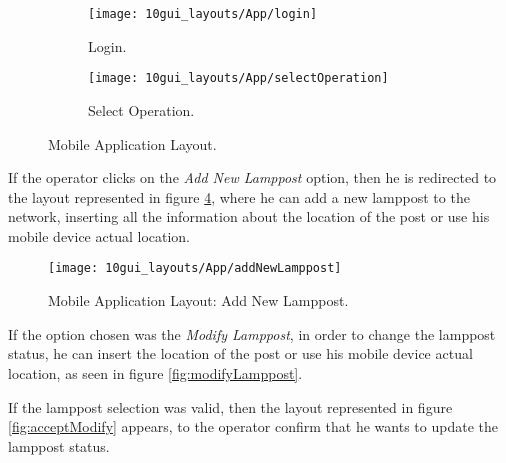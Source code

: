 
\begin{figure}[H]
	\centering
	\begin{subfigure}{.5\textwidth}
		\centering
		\texttt{[image: 10gui\_layouts/App/login]}
		\caption{Login.}
		\label{fig:login}
	\end{subfigure}%
	\begin{subfigure}{.5\textwidth}
		\centering
		\texttt{[image: 10gui\_layouts/App/selectOperation]}
		\caption{Select Operation.}
		\label{fig:selectOperation}
	\end{subfigure}
	\caption{Mobile Application Layout.}
	\label{fig:App}
\end{figure}

If the operator clicks on the \textit{Add New Lamppost} option, then he is redirected to the layout represented in figure \ref{fig:addNewLamppost}, where he can add a new lamppost to the network, inserting all the information about the location of the post or use his mobile device actual location. 

\begin{figure}[H]
	\centering	
	\texttt{[image: 10gui\_layouts/App/addNewLamppost]}
	\caption{Mobile Application Layout: Add New Lamppost.}
	\label{fig:addNewLamppost}
\end{figure}

\clearpage
If the option chosen was the \textit{Modify Lamppost}, in order to change the lamppost status, he can insert the location of the post or use his mobile device actual location, as seen in figure \ref{fig:modifyLamppost}.


If the lamppost selection was valid, then the layout represented in figure \ref{fig:acceptModify} appears, to the operator confirm that he wants to update the lamppost status.


